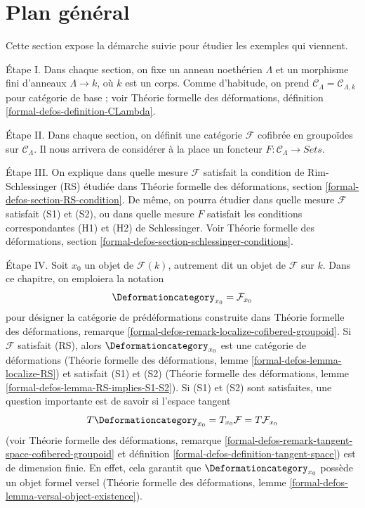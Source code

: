 \section{Plan général}
\label{section-general}

\noindent
Cette section expose la démarche suivie pour étudier les exemples qui viennent.

\medskip\noindent
Étape I. Dans chaque section, on fixe un anneau noethérien $\Lambda$ et
un morphisme fini d'anneaux $\Lambda \to k$, où $k$ est un corps.
Comme d'habitude, on prend $\mathcal{C}_\Lambda = \mathcal{C}_{\Lambda, k}$
pour catégorie de base ; voir Théorie formelle des déformations,
définition \ref{formal-defos-definition-CLambda}.

\medskip\noindent
Étape II. Dans chaque section, on définit une catégorie $\mathcal{F}$
cofibrée en groupoïdes sur $\mathcal{C}_\Lambda$. Il nous arrivera
de considérer à la place un foncteur
$F : \mathcal{C}_\Lambda \to \textit{Sets}$.

\medskip\noindent
Étape III. On explique dans quelle mesure $\mathcal{F}$ satisfait
la condition de Rim-Schlessinger (RS) étudiée dans Théorie formelle
des déformations, section \ref{formal-defos-section-RS-condition}.
De même, on pourra étudier dans quelle mesure $\mathcal{F}$
satisfait (S1) et (S2), ou dans quelle mesure $F$ satisfait
les conditions correspondantes (H1) et (H2) de Schlessinger.
Voir Théorie formelle des déformations, section
\ref{formal-defos-section-schlessinger-conditions}.

\medskip\noindent
Étape IV. Soit $x_0$ un objet de $\mathcal{F}(k)$, autrement dit un objet
de $\mathcal{F}$ sur $k$. Dans ce chapitre, on emploiera la notation
$$
\Deformationcategory_{x_0} = \mathcal{F}_{x_0}
$$
pour désigner la catégorie de prédéformations construite dans Théorie
formelle des déformations, remarque
\ref{formal-defos-remark-localize-cofibered-groupoid}.
Si $\mathcal{F}$ satisfait (RS), alors
$\Deformationcategory_{x_0}$ est une catégorie de déformations
(Théorie formelle des déformations, lemme
\ref{formal-defos-lemma-localize-RS})
et satisfait (S1) et (S2)
(Théorie formelle des déformations, lemme
\ref{formal-defos-lemma-RS-implies-S1-S2}).
Si (S1) et (S2) sont satisfaites, une question importante
est de savoir si l'espace tangent
$$
T\Deformationcategory_{x_0} = T_{x_0}\mathcal{F} = T\mathcal{F}_{x_0}
$$
(voir Théorie formelle des déformations, remarque
\ref{formal-defos-remark-tangent-space-cofibered-groupoid} et
définition \ref{formal-defos-definition-tangent-space})
est de dimension finie. En effet, cela garantit que
$\Deformationcategory_{x_0}$ possède un objet formel versel
(Théorie formelle des déformations, lemme
\ref{formal-defos-lemma-versal-object-existence}).

